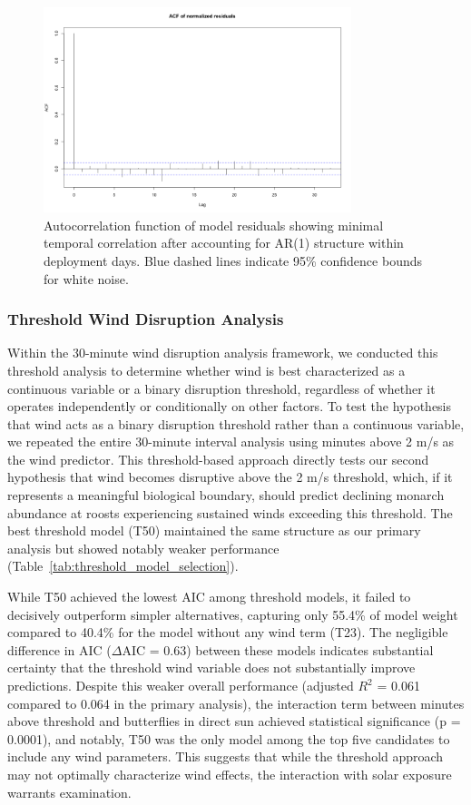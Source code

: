 \begin{figure}[htbp]
    \centering
    \includegraphics[width=0.8\textwidth]{supplemental/results/30_min/figures/diag_acf.png}
    \caption{Autocorrelation function of model residuals showing minimal temporal correlation after accounting for AR(1) structure within deployment days. Blue dashed lines indicate 95\% confidence bounds for white noise.}
    \label{fig:acf_diagnostics}
\end{figure} 

\subsubsection{Threshold Wind Disruption Analysis}

Within the 30-minute wind disruption analysis framework, we conducted this threshold analysis to determine whether wind is best characterized as a continuous variable or a binary disruption threshold, regardless of whether it operates independently or conditionally on other factors. To test the hypothesis that wind acts as a binary disruption threshold rather than a continuous variable, we repeated the entire 30-minute interval analysis using minutes above 2 m/s as the wind predictor. This threshold-based approach directly tests our second hypothesis that wind becomes disruptive above the 2 m/s threshold, which, if it represents a meaningful biological boundary, should predict declining monarch abundance at roosts experiencing sustained winds exceeding this threshold. The best threshold model (T50) maintained the same structure as our primary analysis but showed notably weaker performance (Table~\ref{tab:threshold_model_selection}).

While T50 achieved the lowest AIC among threshold models, it failed to decisively outperform simpler alternatives, capturing only 55.4\% of model weight compared to 40.4\% for the model without any wind term (T23). The negligible difference in AIC ($\Delta$AIC = 0.63) between these models indicates substantial certainty that the threshold wind variable does not substantially improve predictions. Despite this weaker overall performance (adjusted $R^2$ = 0.061 compared to 0.064 in the primary analysis), the interaction term between minutes above threshold and butterflies in direct sun achieved statistical significance (p = 0.0001), and notably, T50 was the only model among the top five candidates to include any wind parameters. This suggests that while the threshold approach may not optimally characterize wind effects, the interaction with solar exposure warrants examination.

